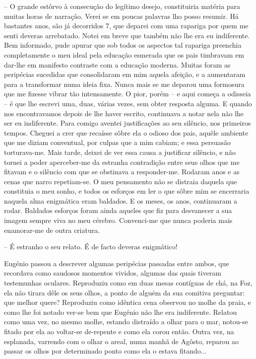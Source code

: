 \documentclass[9pt]{article}
\begin{document}
-- O gran\-de estôrvo à consecu\-ção do legítimo desejo, constituiria ma\-té\-ria
para muitas horas de narra\-ção. Verei se em poucas palavras lho posso resumir.
Há bastantes anos, são já decorridos 7, que deparei com uma rapariga por quem
me senti deveras arrebatado. Notei em breve que também não lhe era eu indiferente. Bem
informado, pude apurar que sob todos os aspectos tal rapariga preenchia completamente o meu ideal pela educa\-ção esmerada que os pais timbravam em \mbox{dar-lhe} em manifesto contraste com a educa\-ção moderna. Muitas foram as peripécias sucedidas que consolidaram em mim aquela afei\-ção, e a aumentaram para
a transformar numa ideia fixa. Nunca mais se me deparou uma formosura que
me fizesse vibrar tão intensamente. O pior, porém -- e aqui começa a odisseia --  é que lhe escrevi uma, duas, várias vezes, sem obter resposta alguma. E quan\-do
nos encontravamos depois de lhe haver escrito, continuava a notar nela não lhe
ser eu indiferente. Para comigo aventei justifi\-ca\-ções ao seu silêncio,
nos primeiros tempos. Cheguei a crer que recaísse sôbre ela o odioso dos pais,
a\-quê\-le am\-bien\-te que me diziam conventual, por culpas que a mim cabiam; e essa persuasão torturava-me. Mais tarde, deixei de ver essa causa a justifi\-car
silêncio, e não tornei a poder aperceber-me da estranha contradi\-ção entre
seus o\-lhos que me fitavam e o silêncio com que se obstinava a responder-me.
Rodaram anos e as cenas que narro repetiam-se. O meu pensamento não se distraia
daquela que constituia o meu sonho, e todos os esforços em ler o que sôbre
mim se encerraria naquela alma enigmática eram baldados. E os meses, os anos,
continuaram a rodar. Baldados esforços foram ainda aqueles que fiz para desvanecer a sua imagem sempre viva no meu cérebro. Convenci-me que nunca poderia mais enamorar-me de outra criatura.

-- É estranho o seu relato. É de facto deveras enigmático!

Eugé\-nio passou a descrever algumas peripécias passadas entre ambos, que
recordava como saudosos momentos vividos, algumas das quais tiveram testemunhas oculares. Reproduziu como em duas mesas contíguas de chá, na Foz, ela não
tirara dêle os seus o\-lhos, a ponto de alguém da sua comitiva preguntar: que
me\-lhor quere? Reproduziu como idêntica cena observou no mo\-lhe da praia, e
como lhe foi notado ver-se bem que Eugé\-nio não lhe era indiferente. Relatou
como uma vez, no mesmo mo\-lhe, estando distraído a o\-lhar para o mar, notou-se
fitado por ela ao voltar-se de-repente e como ela corou então. Outra vez, na
esplanada, varrendo com o o\-lhar o areal, numa manhã de Agôsto, reparou ao pas\-sar os o\-lhos por determinado ponto como ela o estava fitando...
\end{document}
